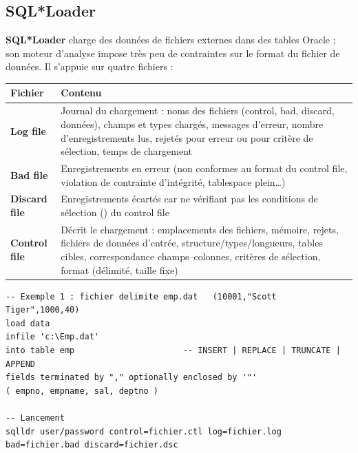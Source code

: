\documentclass[11pt,a4paper]{article}
\newcommand{\kw}[1]{\texttt{\detokenize{#1}}}
\begin{document}
\subsection{SQL*Loader}
\textbf{SQL*Loader} charge des données de fichiers externes dans des tables Oracle ; son moteur d'analyse impose très peu de contraintes sur le format du fichier de données. Il s'appuie sur quatre fichiers :
\begin{center}
\small
\begin{tabular}{@{}lp{12cm}@{}}
\toprule
\textbf{Fichier} & \textbf{Contenu}\\
\midrule
\textbf{Log file} & Journal du chargement : noms des fichiers (control, bad, discard, données), champs et types chargés, messages d'erreur, nombre d'enregistrements lus, rejetés pour erreur ou pour critère de sélection, temps de chargement\\
\textbf{Bad file} & Enregistrements en erreur (non conformes au format du control file, violation de contrainte d'intégrité, tablespace plein\dots)\\
\textbf{Discard file} & Enregistrements écartés car ne vérifiant pas les conditions de sélection (\kw{WHEN}) du control file\\
\textbf{Control file} & Décrit le chargement : emplacements des fichiers, mémoire, rejets, fichiers de données d'entrée, structure/types/longueurs, tables cibles, correspondance champs--colonnes, critères de sélection, format (délimité, taille fixe)\\
\bottomrule
\end{tabular}
\end{center}

\begin{lstlisting}
-- Exemple 1 : fichier delimite emp.dat   (10001,"Scott Tiger",1000,40)
load data
infile 'c:\Emp.dat'
into table emp                      -- INSERT | REPLACE | TRUNCATE | APPEND
fields terminated by "," optionally enclosed by '"'
( empno, empname, sal, deptno )

-- Lancement
sqlldr user/password control=fichier.ctl log=fichier.log bad=fichier.bad discard=fichier.dsc
\end{lstlisting}
\end{document}
